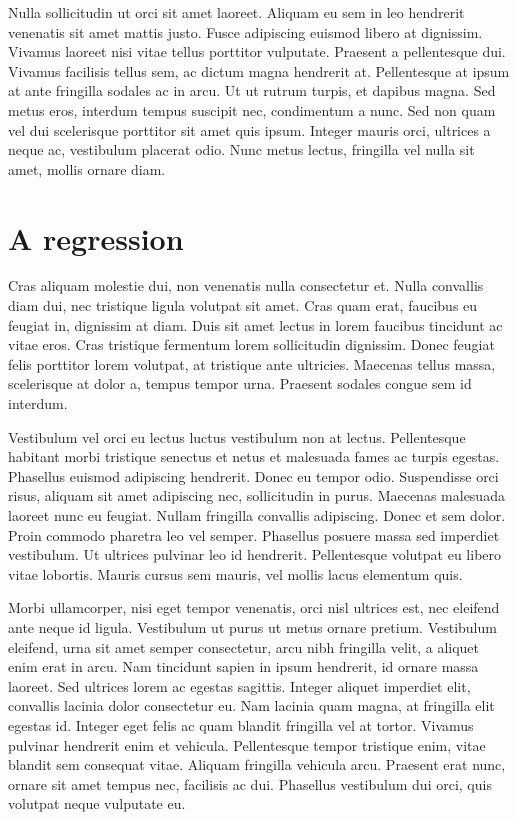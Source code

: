 \documentclass[9pt]{memoir}
\begin{document}
Nulla sollicitudin ut orci sit amet laoreet. Aliquam eu sem in leo hendrerit venenatis sit amet mattis justo. Fusce adipiscing euismod libero at dignissim. Vivamus laoreet nisi vitae tellus porttitor vulputate. Praesent a pellentesque dui. Vivamus facilisis tellus sem, ac dictum magna hendrerit at. Pellentesque at ipsum at ante fringilla sodales ac in arcu. Ut ut rutrum turpis, et dapibus magna. Sed metus eros, interdum tempus suscipit nec, condimentum a nunc. Sed non quam vel dui scelerisque porttitor sit amet quis ipsum. Integer mauris orci, ultrices a neque ac, vestibulum placerat odio. Nunc metus lectus, fringilla vel nulla sit amet, mollis ornare diam.

\section{A regression}
Cras aliquam molestie dui, non venenatis nulla consectetur et. Nulla convallis diam dui, nec tristique ligula volutpat sit amet. Cras quam erat, faucibus eu feugiat in, dignissim at diam. Duis sit amet lectus in lorem faucibus tincidunt ac vitae eros. Cras tristique fermentum lorem sollicitudin dignissim. Donec feugiat felis porttitor lorem volutpat, at tristique ante ultricies. Maecenas tellus massa, scelerisque at dolor a, tempus tempor urna. Praesent sodales congue sem id interdum.

Vestibulum vel orci eu lectus luctus vestibulum non at lectus. Pellentesque habitant morbi tristique senectus et netus et malesuada fames ac turpis egestas. Phasellus euismod adipiscing hendrerit. Donec eu tempor odio. Suspendisse orci risus, aliquam sit amet adipiscing nec, sollicitudin in purus. Maecenas malesuada laoreet nunc eu feugiat. Nullam fringilla convallis adipiscing. Donec et sem dolor. Proin commodo pharetra leo vel semper. Phasellus posuere massa sed imperdiet vestibulum. Ut ultrices pulvinar leo id hendrerit. Pellentesque volutpat eu libero vitae lobortis. Mauris cursus sem mauris, vel mollis lacus elementum quis.

Morbi ullamcorper, nisi eget tempor venenatis, orci nisl ultrices est, nec eleifend ante neque id ligula. Vestibulum ut purus ut metus ornare pretium. Vestibulum eleifend, urna sit amet semper consectetur, arcu nibh fringilla velit, a aliquet enim erat in arcu. Nam tincidunt sapien in ipsum hendrerit, id ornare massa laoreet. Sed ultrices lorem ac egestas sagittis. Integer aliquet imperdiet elit, convallis lacinia dolor consectetur eu. Nam lacinia quam magna, at fringilla elit egestas id. Integer eget felis ac quam blandit fringilla vel at tortor. Vivamus pulvinar hendrerit enim et vehicula. Pellentesque tempor tristique enim, vitae blandit sem consequat vitae. Aliquam fringilla vehicula arcu. Praesent erat nunc, ornare sit amet tempus nec, facilisis ac dui. Phasellus vestibulum dui orci, quis volutpat neque vulputate eu.
\end{document}
